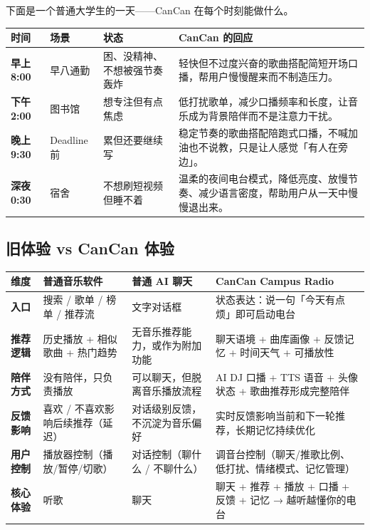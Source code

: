 \documentclass[UTF8,a4paper,11pt,fontset=windows]{ctexart}
\begin{document}
下面是一个普通大学生的一天——CanCan 在每个时刻能做什么。

\begin{longtable}{>{\bfseries}p{1.8cm}p{2.4cm}p{4.2cm}p{5.2cm}}
\toprule
时间 & 场景 & 状态 & CanCan 的回应 \\
\midrule
早上 8:00 & 早八通勤 & 困、没精神、不想被强节奏轰炸 & 轻快但不过度兴奋的歌曲搭配简短开场口播，帮用户慢慢醒来而不制造压力。 \\
下午 2:00 & 图书馆 & 想专注但有点焦虑 & 低打扰歌单，减少口播频率和长度，让音乐成为背景陪伴而不是注意力干扰。 \\
晚上 9:30 & Deadline 前 & 累但还要继续写 & 稳定节奏的歌曲搭配陪跑式口播，不喊加油也不说教，只是让人感觉「有人在旁边」。 \\
深夜 0:30 & 宿舍 & 不想刷短视频但睡不着 & 温柔的夜间电台模式，降低亮度、放慢节奏、减少语言密度，帮助用户从一天中慢慢退出来。 \\
\bottomrule
\end{longtable}

\subsection{旧体验 vs CanCan 体验}



\begin{longtable}{>{\bfseries}p{2.5cm}p{4.0cm}p{4.0cm}p{4.1cm}}
\toprule
维度 & 普通音乐软件 & 普通 AI 聊天 & CanCan Campus Radio \\
\midrule
入口 & 搜索 / 歌单 / 榜单 / 推荐流 & 文字对话框 & 状态表达：说一句「今天有点烦」即可启动电台 \\
推荐逻辑 & 历史播放 + 相似歌曲 + 热门趋势 & 无音乐推荐能力，或作为附加功能 & 聊天语境 + 曲库画像 + 反馈记忆 + 时间天气 + 可播放性 \\
陪伴方式 & 没有陪伴，只负责播放 & 可以聊天，但脱离音乐播放流程 & AI DJ 口播 + TTS 语音 + 头像状态 + 歌曲推荐形成完整陪伴 \\
反馈影响 & 喜欢 / 不喜欢影响后续推荐（延迟） & 对话级别反馈，不沉淀为音乐偏好 & 实时反馈影响当前和下一轮推荐，长期记忆持续优化 \\
用户控制 & 播放器控制（播放/暂停/切歌） & 对话控制（聊什么 / 不聊什么） & 调音台控制（聊天/推歌比例、低打扰、情绪模式、记忆管理） \\
核心体验 & 听歌 & 聊天 & 聊天 + 推荐 + 播放 + 口播 + 反馈 + 记忆 → 越听越懂你的电台 \\
\bottomrule
\end{longtable}
\end{document}
